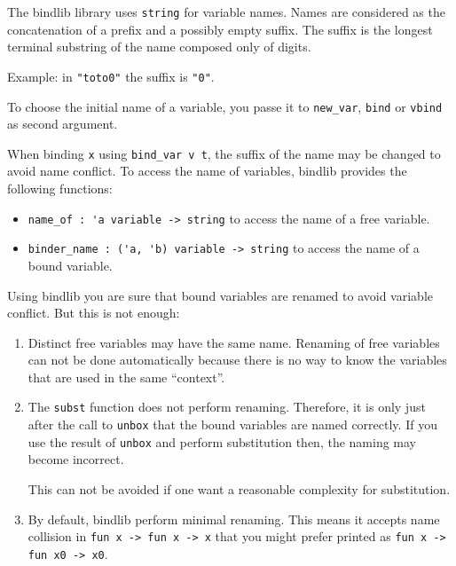 \documentclass[11pt]{article}
\begin{document}
The bindlib library uses \verb#string# for variable names. Names are
considered
as the concatenation of a prefix and a possibly empty suffix. The
suffix is the longest terminal substring of the name composed only of
digits.

Example: in \verb#"toto0"# the suffix is \verb#"0"#.

To choose the initial name of a variable, you passe it to
\verb#new_var#, \verb#bind# or \verb#vbind# as second argument.

When binding \verb#x# using \verb#bind_var v t#, the suffix of
the name may be changed to avoid name conflict.
To access the name of variables, bindlib provides the following
functions:

\begin{itemize}
\item \verb#name_of : 'a variable -> string# to access the name of a free
  variable.

\item \verb#binder_name : ('a, 'b) variable -> string# to access the
  name of a bound variable.
\end{itemize}

Using bindlib you are sure that bound variables are renamed to avoid
variable conflict. But this is not enough:
\begin{enumerate}
\item Distinct free variables may have the same name. Renaming of free
  variables can not be done automatically because there is no way to
  know the variables that are used in the same ``context''.
\item The \verb#subst# function does not perform renaming. Therefore,
  it is only just after the call to \verb#unbox# that the bound
  variables are named correctly. If you use the result of \verb#unbox#
  and perform substitution then, the naming may become incorrect.

  This can not be avoided if one want a reasonable complexity for
  substitution.

\item By default, bindlib perform minimal renaming. This means it
  accepts name collision in \verb#fun x -> fun x -> x# that you might prefer printed as
\verb#fun x -> fun x0 -> x0#.
\end{enumerate}
\end{document}
